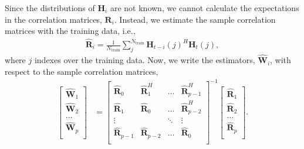 Since the distributions of $\mathbf{H}_i$ are not known, we cannot calculate the expectations in the correlation matrices, $\mathbf R_i$. Instead, we estimate the sample correlation matrices with the training data, i.e.,
\begin{align*}
	\hat{\mathbf{R}}_i = \frac{1}{N_{\text{train}}} \sum_{j}^{N_{\text{train}}} \mathbf{H}_{t-i}(j)^{H}\mathbf{H}_{t}(j),
\end{align*}
where $j$ indexes over the training data. Now, we write the estimators, $\hat{\mathbf{W}}_i$, with respect to the sample correlation matrices,
\begin{align}
  \begin{bmatrix}
    \hat{\mathbf W}_{1} \\ \hat{\mathbf W}_{2} \\ \dots \\ \hat{\mathbf W}_{p} \\
  \end{bmatrix}
  &= 
  \begin{bmatrix}
    \hat{\mathbf R}_{0} & \hat{\mathbf R}_1^H & \dots  & \hat{\mathbf R}_{p-1}^H \\
    \hat{\mathbf R}_{1} & \hat{\mathbf R}_0   & \dots  & \hat{\mathbf R}_{p-2}^H \\
    \vdots      &         & \ddots & \vdots \\
    \hat{\mathbf R}_{p-1} & \hat{\mathbf R}_{p-2}   & \dots  & \hat{\mathbf R}_{0} \\
  \end{bmatrix}^{-1}
  \begin{bmatrix}
    \hat{\mathbf R}_{1} \\ \hat{\mathbf R}_{2} \\ \dots \\ \hat{\mathbf R}_{p} \\
  \end{bmatrix}. \label{eq:toep-sol}
\end{align}